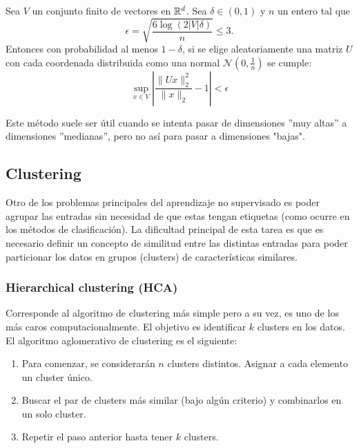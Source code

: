 \begin{itemize}
    \begin{theorem} 
    Sea $V$ un conjunto finito de vectores en $\mathbb{R}^d$. Sea $\delta \in (0,1)$ y $n$ un entero tal que
    $$
    \epsilon = \sqrt{\dfrac{6 \log(2 |V|\delta)}{n}}  \leq 3.
    $$
    Entonces con probabilidad al menos $1-\delta$, si se elige aleatoriamente una matriz $U$ con cada coordenada distribuida como una normal $\mathcal{N}(0, \frac{1}{n})$ se cumple: 
    $$
    \underset{x \in V}{\sup} \left | \dfrac{\|Ux\|_2^2}{\|x\|_2} -1 \right | < \epsilon 
    $$
    
    \end{theorem}
    
    \begin{remark}
    Este método suele ser útil cuando se intenta pasar de dimensiones ''muy altas'' a dimensiones ''medianas'', pero no así para pasar a dimensiones "bajas". 
    \end{remark}
\end{itemize}



\subsection{Clustering}

Otro de los problemas principales del aprendizaje no supervisado es poder agrupar las entradas sin necesidad de que estas tengan etiquetas (como ocurre en los métodos de clasificación). La dificultad principal de esta tarea es que es necesario definir un concepto de similitud entre las distintas entradas para poder particionar los datos en grupos (clusters) de características similares.

\subsubsection{Hierarchical clustering (HCA)}

Corresponde al algoritmo de clustering más simple pero a su vez, es uno de los más caros computacionalmente. El objetivo es identificar $k$ clusters en los datos.\\

 El algoritmo aglomerativo de clustering es el siguiente:

\begin{enumerate}
	\item Para comenzar, se considerarán $n$ clusters distintos. Asignar a cada elemento un cluster único.
	\item Buscar el par de clusters más similar (bajo algún criterio) y combinarlos en un solo cluster.
	\item Repetir el paso anterior hasta tener $k$ clusters.
\end{enumerate}

